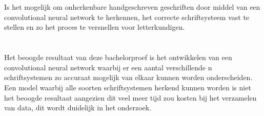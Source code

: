 \section{}
\label{sec:onderzoeksvraag}


Is het mogelijk om onherkenbare handgeschreven geschriften door middel van een convolutional neural network te herkennen, het correcte schriftsysteem vast te stellen en zo het proces te versnellen voor letterkundigen.


\section{}
\label{sec:onderzoeksdoelstelling}

Het beoogde resultaat van deze bachelorproef is het ontwikkelen van een convolutional neural network waarbij er een aantal verschillende n schriftsystemen zo accuraat mogelijk van elkaar kunnen worden onderscheiden.
Een model waarbij alle soorten schriftsystemen herkend kunnen worden is niet het beoogde resultaat aangezien dit veel meer tijd zou kosten bij het verzamelen van data, dit wordt duidelijk in het onderzoek.


\section{}
\label{sec:opzet-bachelorproef}


